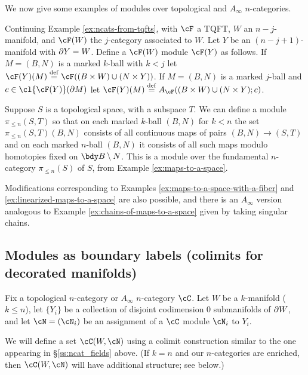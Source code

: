 \medskip

We now give some examples of modules over topological and $A_\infty$ $n$-categories.

\begin{example}
\rm
Continuing Example \ref{ex:ncats-from-tqfts}, with $\cF$ a TQFT, $W$ an $n{-}j$-manifold,
and $\cF(W)$ the $j$-category associated to $W$.
Let $Y$ be an $(n{-}j{+}1)$-manifold with $\partial Y = W$.
Define a $\cF(W)$ module $\cF(Y)$ as follows.
If $M = (B, N)$ is a marked $k$-ball with $k<j$ let 
$\cF(Y)(M)\deq \cF((B\times W) \cup (N\times Y))$.
If $M = (B, N)$ is a marked $j$-ball and $c\in \cl{\cF(Y)}(\bd M)$ let
$\cF(Y)(M)\deq A_\cF((B\times W) \cup (N\times Y); c)$.
\end{example}

\begin{example}
\rm
Suppose $S$ is a topological space, with a subspace $T$.
We can define a module $\pi_{\leq n}(S,T)$ so that on each marked $k$-ball $(B,N)$ 
for $k<n$ the set $\pi_{\leq n}(S,T)(B,N)$ consists of all continuous maps of pairs 
$(B,N) \to (S,T)$ and on each marked $n$-ball $(B,N)$ it consists of all 
such maps modulo homotopies fixed on $\bdy B \setminus N$.
This is a module over the fundamental $n$-category $\pi_{\leq n}(S)$ of $S$, from Example \ref{ex:maps-to-a-space}.
\end{example}
Modifications corresponding to Examples \ref{ex:maps-to-a-space-with-a-fiber} and 
\ref{ex:linearized-maps-to-a-space} are also possible, and there is an $A_\infty$ version analogous to 
Example \ref{ex:chains-of-maps-to-a-space} given by taking singular chains.

\subsection{Modules as boundary labels (colimits for decorated manifolds)}
\label{moddecss}

Fix a topological $n$-category or $A_\infty$ $n$-category  $\cC$.
Let $W$ be a $k$-manifold ($k\le n$),
let $\{Y_i\}$ be a collection of disjoint codimension 0 submanifolds of $\partial W$,
and let $\cN = (\cN_i)$ be an assignment of a $\cC$ module $\cN_i$ to $Y_i$.

We will define a set $\cC(W, \cN)$ using a colimit construction similar to 
the one appearing in \S \ref{ss:ncat_fields} above.
(If $k = n$ and our $n$-categories are enriched, then
$\cC(W, \cN)$ will have additional structure; see below.)

